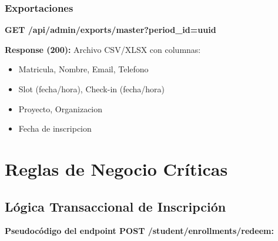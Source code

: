 \documentclass[12pt,a4paper]{article}
\begin{document}
\subsubsection{Exportaciones}

\textbf{GET /api/admin/exports/master?period\_id=uuid}

\textbf{Response (200):} Archivo CSV/XLSX con columnas:
\begin{itemize}[leftmargin=*]
    \item Matricula, Nombre, Email, Telefono
    \item Slot (fecha/hora), Check-in (fecha/hora)
    \item Proyecto, Organizacion
    \item Fecha de inscripcion
\end{itemize}

\section{Reglas de Negocio Críticas}

\subsection{Lógica Transaccional de Inscripción}

\textbf{Pseudocódigo del endpoint POST /student/enrollments/redeem:}
\end{document}

